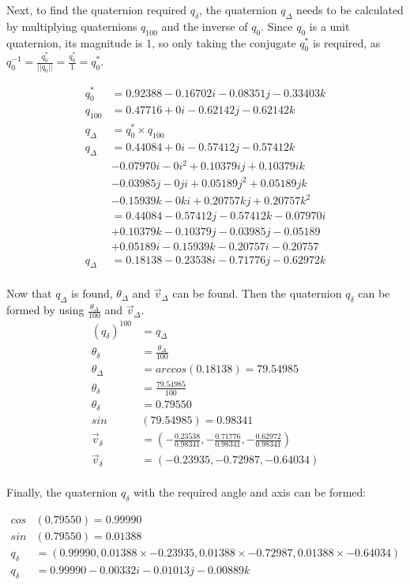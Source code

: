 \documentclass{article}
\begin{document}
Next, to find the quaternion required $q_{\delta}$, the quaternion $q_{\Delta}$ needs to be calculated by multiplying quaternions $q_{100}$ and the inverse of $q_{0}$. Since $q_{0}$ is a unit quaternion, its magnitude is $1$, so only taking the conjugate $q^*_0$ is required, as $q^{-1}_0 = \frac{q^*_0}{||q_0||} = \frac{q^*_0}{1} = q^*_0$.

\begin{align*}
q_0^* &= 0.92388 - 0.16702i - 0.08351j - 0.33403k\\[1em]
q_{100} &= 0.47716 + 0i - 0.62142j - 0.62142k\\[1em]
q_{\Delta} &= q_0^* \times q_{100}\\[1em]
q_{\Delta} &= 0.44084 + 0i - 0.57412j - 0.57412k\\
 &- 0.07970i - 0i^2 + 0.10379ij + 0.10379ik\\
 &- 0.03985j - 0ji + 0.05189j^2 + 0.05189jk\\
 &- 0.15939k - 0ki + 0.20757kj + 0.20757k^2\\[1em]
 &= 0.44084 - 0.57412j - 0.57412k - 0.07970i\\
 &+ 0.10379k - 0.10379j - 0.03985j - 0.05189\\
 &+ 0.05189i - 0.15939k - 0.20757i - 0.20757\\[1em]
q_{\Delta} &=0.18138 - 0.23538i - 0.71776j - 0.62972k\\[1em]
\end{align*}

Now that $q_{\Delta}$ is found, $\theta_{\Delta}$ and $\vec{v}_{\Delta}$ can be found. Then the quaternion $q_{\delta}$ can be formed by using $\frac{\theta_{\Delta}}{100}$ and $\vec{v}_{\Delta}$.
\begin{align*}
(q_{\delta})^{100} &= q_{\Delta}\\[1em]
\theta_{\delta} &= \frac{\theta_{\Delta}}{100}\\[1em]
\theta_{\Delta} &= arccos(0.18138) = 79.54985\\[1em]
\theta_{\delta} &= \frac{79.54985}{100}\\[1em]
\theta_{\delta} &= 0.79550\\[1em]
sin&(79.54985) = 0.98341\\[1em]
\vec{v}_{\delta} &=  (- \frac{0.23538}{0.98341}, - \frac{0.71776}{0.98341}, - \frac{0.62972}{0.98341})\\
\vec{v}_{\delta} &= (-0.23935, -0.72987, -0.64034)\\[1em]
\end{align*}

Finally, the quaternion $q_{\delta}$ with the required angle and axis can be formed:

\begin{align*}
cos&(0.79550) = 0.99990\\[1em]
sin&(0.79550) = 0.01388\\[1em]
q_{\delta} &= (0.99990, 0.01388 \times - 0.23935, 0.01388 \times - 0.72987, 0.01388 \times - 0.64034)\\[1em]
q_{\delta} &= 0.99990 - 0.00332i - 0.01013j - 0.00889k\\
\end{align*}
\end{document}
